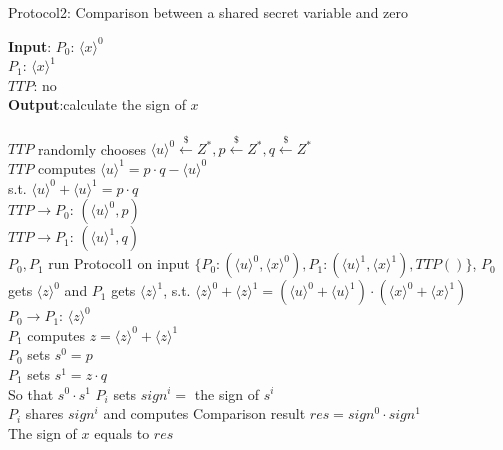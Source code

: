 \documentclass[11pt,twoside,a4paper]{article}
\begin{document}
\begin{algorithm}[htbp]
	\caption{Protocol2: Comparison between a shared secret variable and zero}
	\textbf{Input}: $P_{0}$: $\langle x\rangle ^{0}$\\
	$P_{1}$: $\langle x\rangle ^{1}$\\
	$TTP$: no\\
	\textbf{Output}:calculate the sign of $x$\\
	~\\
	$TTP$ randomly chooses $\langle u\rangle ^{0}\xleftarrow{\$}Z^{*}, p\xleftarrow{\$}Z^{*}, q\xleftarrow{\$}Z^{*}$\\
	$TTP$ computes $\langle u\rangle ^{1}=p\cdot q-\langle u\rangle ^{0}$\\
	s.t. $\langle u\rangle ^{0}+\langle u\rangle ^{1}=p\cdot q$\\
	$TTP\rightarrow P_{0}$: $(\langle u\rangle ^{0}, p)$\\
	$TTP\rightarrow P_{1}$: $(\langle u\rangle ^{1}, q)$\\
	$P_{0}, P_{1}$ run Protocol1 on input $\{P_{0}:(\langle u\rangle ^{0},\langle x\rangle ^{0}), P_{1}:(\langle u\rangle ^{1},\langle x\rangle ^{1}), TTP()\}$, 
	$P_{0}$ gets $\langle z\rangle ^{0}$ and $P_{1}$ gets $\langle z\rangle ^{1}$, 
	s.t. $\langle z\rangle ^{0}+\langle z\rangle ^{1}=(\langle u\rangle ^{0}+\langle u\rangle ^{1})\cdot(\langle x\rangle ^{0}+\langle x\rangle ^{1})$\\
	$P_{0}\rightarrow P_{1}$: $\langle z\rangle ^{0}$\\
	$P_{1}$ computes $z=\langle z\rangle ^{0}+\langle z\rangle ^{1}$\\

	$P_{0}$ sets $s^{0}=p$\\
	$P_{1}$ sets $s^{1}=z\cdot q$\\
	So that $s^{0}\cdot s^{1}$
	$P_{i}$ sets $sign^{i}=$ the sign of $s^{i}$\\
	$P_{i}$ shares $sign^{i}$ and computes Comparison result $res=sign^{0}\cdot sign^{1}$ \\
	The sign of $x$ equals to $res$\\
\end{algorithm}
\end{document}
